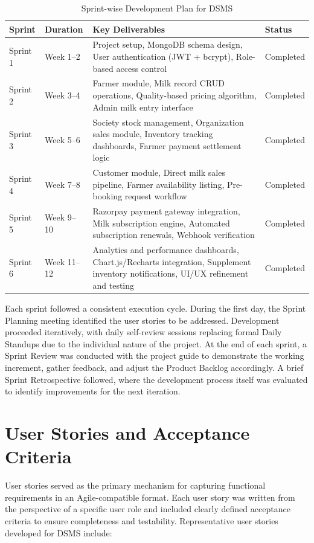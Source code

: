 \documentclass[12pt,a4paper]{report}
\begin{document}
\vspace{0.4cm}
\renewcommand{\arraystretch}{1.5}
\begin{table}[htbp]
\centering
\begin{tabular}{|p{2cm}|p{3.5cm}|p{5cm}|p{3.5cm}|}
\hline
\textbf{Sprint} & \textbf{Duration} & \textbf{Key Deliverables} & \textbf{Status} \\ \hline
Sprint 1 & Week 1--2 & Project setup, MongoDB schema design, User authentication (JWT + bcrypt), Role-based access control & Completed \\ \hline
Sprint 2 & Week 3--4 & Farmer module, Milk record CRUD operations, Quality-based pricing algorithm, Admin milk entry interface & Completed \\ \hline
Sprint 3 & Week 5--6 & Society stock management, Organization sales module, Inventory tracking dashboards, Farmer payment settlement logic & Completed \\ \hline
Sprint 4 & Week 7--8 & Customer module, Direct milk sales pipeline, Farmer availability listing, Pre-booking request workflow & Completed \\ \hline
Sprint 5 & Week 9--10 & Razorpay payment gateway integration, Milk subscription engine, Automated subscription renewals, Webhook verification & Completed \\ \hline
Sprint 6 & Week 11--12 & Analytics and performance dashboards, Chart.js/Recharts integration, Supplement inventory notifications, UI/UX refinement and testing & Completed \\ \hline
\end{tabular}
\caption{Sprint-wise Development Plan for DSMS}
\end{table}
\vspace{0.4cm}

Each sprint followed a consistent execution cycle. During the first day, the Sprint Planning meeting identified the user stories to be addressed. Development proceeded iteratively, with daily self-review sessions replacing formal Daily Standups due to the individual nature of the project. At the end of each sprint, a Sprint Review was conducted with the project guide to demonstrate the working increment, gather feedback, and adjust the Product Backlog accordingly. A brief Sprint Retrospective followed, where the development process itself was evaluated to identify improvements for the next iteration.

\section{User Stories and Acceptance Criteria}
\vspace{0.5cm}
User stories served as the primary mechanism for capturing functional requirements in an Agile-compatible format. Each user story was written from the perspective of a specific user role and included clearly defined acceptance criteria to ensure completeness and testability. Representative user stories developed for DSMS include:
\end{document}
